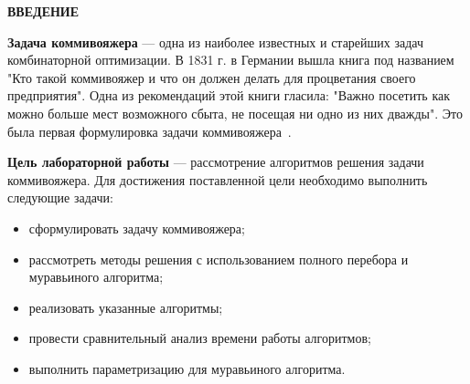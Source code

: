 \begin{center}
    \textbf{ВВЕДЕНИЕ}
\end{center}

\textbf{Задача коммивояжера} — одна из наиболее известных и старейших задач комбинаторной оптимизации. В 1831 г. в Германии вышла книга под названием "Кто такой коммивояжер и что он должен делать для процветания своего предприятия".
Одна из рекомендаций этой книги гласила: "Важно посетить как можно больше мест возможного сбыта, не посещая ни одно из них дважды". Это была первая формулировка задачи коммивояжера~\cite{com_info}.

\textbf{Цель лабораторной работы} --- рассмотрение алгоритмов решения задачи коммивояжера.
Для достижения поставленной цели необходимо выполнить следующие задачи:

\begin{itemize}
	\item сформулировать задачу коммивояжера;
    \item рассмотреть методы решения с использованием полного перебора и муравьиного алгоритма;
    \item реализовать указанные алгоритмы;
    \item провести сравнительный анализ времени работы алгоритмов;
    \item выполнить параметризацию для муравьиного алгоритма.
\end{itemize}